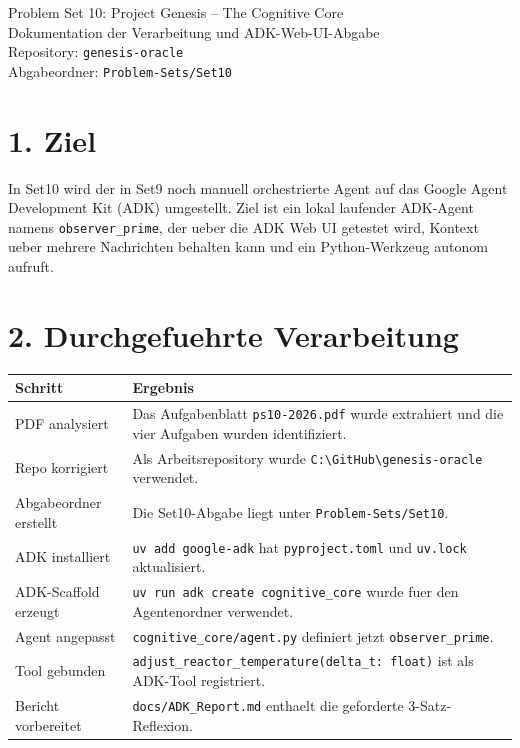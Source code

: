 \documentclass[11pt,a4paper]{article}
\newcommand{\code}[1]{\texttt{#1}}
\begin{document}
\begin{center}
  {\LARGE Problem Set 10: Project Genesis -- The Cognitive Core}\\[4pt]
  {\large Dokumentation der Verarbeitung und ADK-Web-UI-Abgabe}\\[8pt]
  Repository: \code{genesis-oracle}\\
  Abgabeordner: \code{Problem-Sets/Set10}
\end{center}

\section*{1. Ziel}

In Set10 wird der in Set9 noch manuell orchestrierte Agent auf das Google Agent
Development Kit (ADK) umgestellt. Ziel ist ein lokal laufender ADK-Agent namens
\code{observer\_prime}, der ueber die ADK Web UI getestet wird, Kontext ueber
mehrere Nachrichten behalten kann und ein Python-Werkzeug autonom aufruft.

\section*{2. Durchgefuehrte Verarbeitung}

\begin{tabular}{>{\raggedright\arraybackslash}p{}p{}}
\textbf{Schritt} & \textbf{Ergebnis}\\
\hline
PDF analysiert & Das Aufgabenblatt \code{ps10-2026.pdf} wurde extrahiert und die vier Aufgaben wurden identifiziert.\\
Repo korrigiert & Als Arbeitsrepository wurde \code{C:\textbackslash GitHub\textbackslash genesis-oracle} verwendet.\\
Abgabeordner erstellt & Die Set10-Abgabe liegt unter \code{Problem-Sets/Set10}.\\
ADK installiert & \code{uv add google-adk} hat \code{pyproject.toml} und \code{uv.lock} aktualisiert.\\
ADK-Scaffold erzeugt & \code{uv run adk create cognitive\_core} wurde fuer den Agentenordner verwendet.\\
Agent angepasst & \code{cognitive\_core/agent.py} definiert jetzt \code{observer\_prime}.\\
Tool gebunden & \code{adjust\_reactor\_temperature(delta\_t: float)} ist als ADK-Tool registriert.\\
Bericht vorbereitet & \code{docs/ADK\_Report.md} enthaelt die geforderte 3-Satz-Reflexion.\\
\end{tabular}
\end{document}
